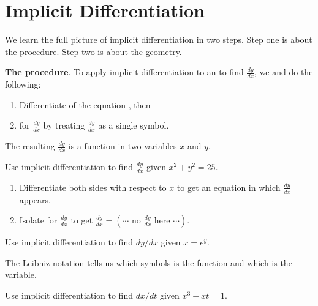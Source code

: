 \documentclass[../main.tex]{subfiles}
\begin{document}
 \section{Implicit Differentiation}
  We learn the full picture of implicit differentiation in two steps. Step one is about the procedure. Step two is about the geometry.

  \begin{mdframed}[style=simple-compact]
    \textbf{The procedure}. To apply implicit differentiation to an  to find \(\tfrac{dy}{dx}\), we   and do the following:
    \begin{enumerate}
      \item Differentiate  of the equation , then
      \item {} for \(\tfrac{dy}{dx}\) by treating \(\tfrac{dy}{dx}\) as a single symbol.
    \end{enumerate}

    The resulting \(\tfrac{dy}{dx}\) is a function in two variables \(x\) and \(y\). 
  \end{mdframed}

  \begin{example} \label{ex:implicit-circle}
    Use implicit differentiation to find \(\tfrac{dy}{dx}\) given \(x^{2} + y^{2} = 25\). 

    \begin{enumerate}
      \item Differentiate both sides with respect to \(x\) to get an equation in which \(\tfrac{dy}{dx}\) appears.
      \item Isolate for \(\tfrac{dy}{dx}\) to get \(\tfrac{dy}{dx} = \left( \cdots \text{ no } \tfrac{dy}{dx} \text{ here } \cdots \right)\).
    \end{enumerate}
  \end{example}

  \begin{example}
    Use implicit differentiation to find \(dy/dx\) given \(x = e^{y}\). 

  \end{example}

  \clearpage
  The Leibniz notation tells us which symbols is the function and which is the variable.
  \begin{example}
    Use implicit differentiation to find \(dx/dt\) given \(x^{3} - xt = 1\).  

  \end{example}
\end{document}
